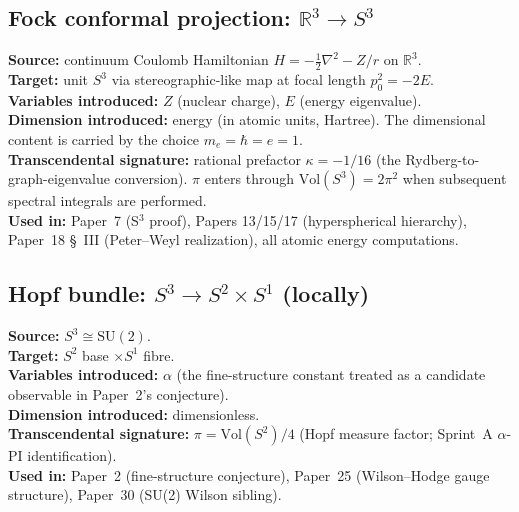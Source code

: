 \documentclass[11pt]{article}
\begin{document}
\subsection{Fock conformal projection: $\mathbb{R}^3 \to S^3$}
\label{sec:proj_fock}
\textbf{Source:} continuum Coulomb Hamiltonian $H = -\tfrac{1}{2}\nabla^2 - Z/r$
on $\mathbb{R}^3$.\\
\textbf{Target:} unit $S^3$ via stereographic-like map at focal
length $p_0^2 = -2E$.\\
\textbf{Variables introduced:} $Z$ (nuclear charge), $E$ (energy
eigenvalue).\\
\textbf{Dimension introduced:} energy (in atomic units, Hartree).
The dimensional content is carried by the choice
$m_e = \hbar = e = 1$.\\
\textbf{Transcendental signature:} rational prefactor
$\kappa = -1/16$ (the Rydberg-to-graph-eigenvalue conversion).
$\pi$ enters through $\mathrm{Vol}(S^3) = 2\pi^2$ when subsequent
spectral integrals are performed.\\
\textbf{Used in:} Paper~7 (S$^3$ proof), Papers 13/15/17
(hyperspherical hierarchy), Paper~18 \S~III (Peter--Weyl
realization), all atomic energy computations.

\subsection{Hopf bundle: $S^3 \to S^2 \times S^1$ (locally)}
\label{sec:proj_hopf}
\textbf{Source:} $S^3 \cong \mathrm{SU}(2)$.\\
\textbf{Target:} $S^2$ base $\times S^1$ fibre.\\
\textbf{Variables introduced:} $\alpha$ (the fine-structure constant
treated as a candidate observable in Paper~2's conjecture).\\
\textbf{Dimension introduced:} dimensionless.\\
\textbf{Transcendental signature:} $\pi = \mathrm{Vol}(S^2)/4$
(Hopf measure factor; Sprint~A $\alpha$-PI identification).\\
\textbf{Used in:} Paper~2 (fine-structure conjecture), Paper~25
(Wilson--Hodge gauge structure), Paper~30 (SU(2) Wilson sibling).
\end{document}
